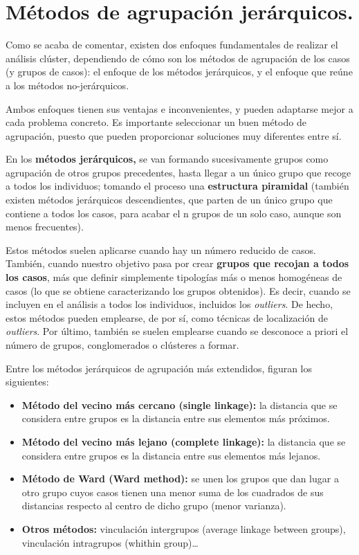 \documentclass[
]{book}
\begin{document}
\section{Métodos de agrupación jerárquicos.}\label{muxe9todos-de-agrupaciuxf3n-jeruxe1rquicos.}

Como se acaba de comentar, existen dos enfoques fundamentales de realizar el análisis clúster, dependiendo de cómo son los métodos de agrupación de los casos (y grupos de casos): el enfoque de los métodos jerárquicos, y el enfoque que reúne a los métodos no-jerárquicos.

Ambos enfoques tienen sus ventajas e inconvenientes, y pueden adaptarse mejor a cada problema concreto. Es importante seleccionar un buen método de agrupación, puesto que pueden proporcionar soluciones muy diferentes entre sí.

En los \textbf{métodos jerárquicos,} se van formando sucesivamente grupos como agrupación de otros grupos precedentes, hasta llegar a un único grupo que recoge a todos los individuos; tomando el proceso una \textbf{estructura piramidal} (también existen métodos jerárquicos descendientes, que parten de un único grupo que contiene a todos los casos, para acabar el n grupos de un solo caso, aunque son menos frecuentes).

Estos métodos suelen aplicarse cuando hay un número reducido de casos. También, cuando nuestro objetivo pasa por crear \textbf{grupos que recojan a todos los casos}, más que definir simplemente tipologías más o menos homogéneas de casos (lo que se obtiene caracterizando los grupos obtenidos). Es decir, cuando se incluyen en el análisis a todos los individuos, incluidos los \emph{outliers}. De hecho, estos métodos pueden emplearse, de por sí, como técnicas de localización de \emph{outliers}. Por último, también se suelen emplearse cuando se desconoce a priori el número de grupos, conglomerados o clústeres a formar.

Entre los métodos jerárquicos de agrupación más extendidos, figuran los siguientes:

\begin{itemize}
\item
  \textbf{Método del vecino más cercano (single linkage):} la distancia que se considera entre grupos es la distancia entre sus elementos más próximos.
\item
  \textbf{Método del vecino más lejano (complete linkage):} la distancia que se considera entre grupos es la distancia entre sus elementos más lejanos.
\item
  \textbf{Método de Ward (Ward method):} se unen los grupos que dan lugar a otro grupo cuyos casos tienen una menor suma de los cuadrados de sus distancias respecto al centro de dicho grupo (menor varianza).
\item
  \textbf{Otros métodos:} vinculación intergrupos (average linkage between groups), vinculación intragrupos (whithin group)\ldots{}
\end{itemize}
\end{document}
